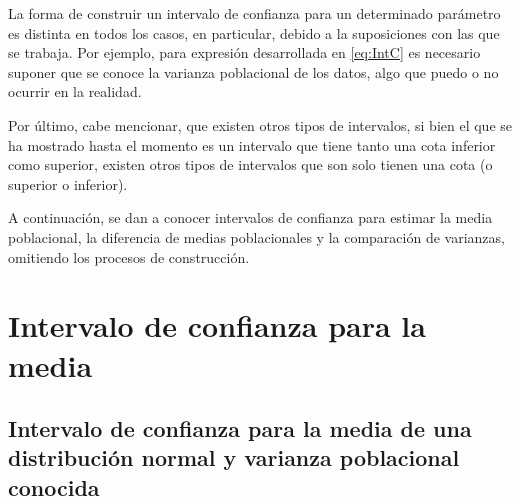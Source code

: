 \documentclass[
  11pt,
]{book}
\theoremstyle{definition}
\theoremstyle{definition}
\theoremstyle{definition}
\theoremstyle{definition}
\theoremstyle{remark}
\begin{document}
La forma de construir un intervalo de confianza para un determinado parámetro es distinta en todos los casos, en particular, debido a la suposiciones con las que se trabaja. Por ejemplo, para expresión desarrollada en \eqref{eq:IntC} es necesario suponer que se conoce la varianza poblacional de los datos, algo que puedo o no ocurrir en la realidad.

Por último, cabe mencionar, que existen otros tipos de intervalos, si bien el que se ha mostrado hasta el momento es un intervalo que tiene tanto una cota inferior como superior, existen otros tipos de intervalos que son solo tienen una cota (o superior o inferior).

A continuación, se dan a conocer intervalos de confianza para estimar la media poblacional, la diferencia de medias poblacionales y la comparación de varianzas, omitiendo los procesos de construcción.

\section{Intervalo de confianza para la media}\label{intervalo-de-confianza-para-la-media}

\subsection{Intervalo de confianza para la media de una distribución normal y varianza poblacional conocida}\label{intervalo-de-confianza-para-la-media-de-una-distribuciuxf3n-normal-y-varianza-poblacional-conocida}

\begin{table}[H]
\centering
\caption{\label{tab:unnamed-chunk-9}Intervalos de confianza para la media de una distribución normal y varianza poblacional conocida}
\centering
{}
\end{table}
\end{document}
